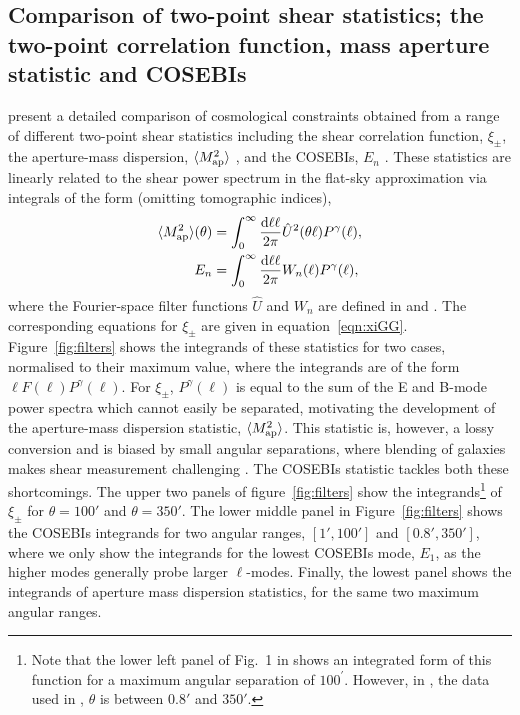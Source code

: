 \subsection{Comparison of two-point shear statistics; the two-point correlation
function, mass aperture statistic and COSEBIs}


\citet{CFHTLenS-2pt-notomo} present a detailed comparison of cosmological
constraints obtained from a range of different two-point shear statistics
including the shear correlation function, $\xi_\pm$, the aperture-mass
dispersion, $\langle M_ {\rm ap}^2 \rangle$ \citep{1998MNRAS.296..873S}, and
the COSEBIs, $E_n$ \citep{COSEBIs}.  These statistics are linearly related to
the shear power spectrum in the flat-sky approximation via integrals of the
form (omitting tomographic indices),
%
\begin{align}
  \langle M_ {\rm ap}^2 \rangle(\theta) & = \int_0^{\infty}\frac{{\rm d} \ell \ell}{2\pi}
  \hat U^2(\theta\ell) P^\gamma(\ell),
  \label{eqn:integ}
  \\
  E_n & = \int_0^{\infty}\frac{{\rm d} \ell \ell}{2\pi} W_n(\ell) P^\gamma(\ell),
\end{align}
%
where the Fourier-space filter functions $\hat U$ and $W_n$ are defined in
\cite{1998MNRAS.296..873S} and \cite{COSEBIs}. The corresponding equations for
$\xi_\pm$ are given in equation~\ref{eqn:xiGG}. Figure~\ref{fig:filters} shows
the integrands of these statistics for two cases, normalised to their maximum
value, where the integrands are of the form $\ell F(\ell) P^\gamma(\ell)$. For
$\xi_\pm$, $P^\gamma(\ell)$ is equal to the sum of the E and B-mode power spectra
which cannot easily be separated,
motivating the development of the aperture-mass dispersion statistic, $\langle
M_ {\rm ap}^2 \rangle$. This statistic is, however, a lossy conversion and is
biased by small angular separations, where blending of galaxies makes shear
measurement challenging \citep{KSE06}. The COSEBIs statistic tackles both
these shortcomings.  The upper two panels of figure~\ref{fig:filters} show the
integrands\footnote{Note that the lower left panel of Fig.~1 in
\citet{2016arXiv161104954K} shows an integrated form of this function for a
maximum angular separation of $100^\prime$. However, in
\citet{CFHTLenS-2pt-notomo}, the data used in \citet{2016arXiv161104954K},
$\theta$ is between $0.8'$ and $350'$.} of $\xi_\pm$ for $\theta=100'$ and
$\theta=350'$. The lower middle panel in Figure~\ref{fig:filters} shows the
COSEBIs integrands for two angular ranges, $[1',100']$ and $[0.8',350']$, where
we only show the integrands for the lowest COSEBIs mode, $E_1$, as the higher
modes generally probe larger $\ell$-modes.  Finally, the lowest panel shows the
integrands of aperture mass dispersion statistics, for the same two maximum
angular ranges. 


